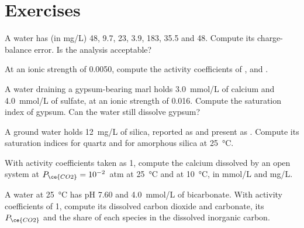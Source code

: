 \section{Exercises}

\begin{exercise}[$\star$]\label{exo:b3:water-rock-interaction:1}
A water has (in \unit{mg/L})  48,  9.7,  23,  3.9,
 183,  35.5 and  48. Compute its charge-balance
error. Is the analysis acceptable?
\end{exercise}

\begin{exercise}[$\star$]\label{exo:b3:water-rock-interaction:2}
At an ionic strength of 0.0050, compute the activity coefficients of
,  and .
\end{exercise}

\begin{exercise}[$\star$]\label{exo:b3:water-rock-interaction:3}
A water draining a gypsum-bearing marl holds \qty{3.0}{mmol/L} of calcium and
\qty{4.0}{mmol/L} of sulfate, at an ionic strength of 0.016. Compute the
saturation index of gypsum. Can the water still dissolve gypsum?
\end{exercise}

\begin{exercise}[$\star$]\label{exo:b3:water-rock-interaction:4}
A ground water holds \qty{12}{mg/L} of silica, reported as  and
present as . Compute its saturation indices for quartz and for
amorphous silica at \qty{25}{\celsius}.
\end{exercise}

\begin{exercise}[$\star\star$]\label{exo:b3:water-rock-interaction:5}
With activity coefficients taken as 1, compute the calcium dissolved by an
open system at $P_{\ce{CO2}} = 10^{-2}$~atm at \qty{25}{\celsius} and at
\qty{10}{\celsius}, in \unit{mmol/L} and \unit{mg/L}.
\end{exercise}

\begin{exercise}[$\star\star$]\label{exo:b3:water-rock-interaction:6}
A water at \qty{25}{\celsius} has pH 7.60 and \qty{4.0}{mmol/L} of
bicarbonate. With activity coefficients of 1, compute its dissolved carbon
dioxide and carbonate, its $P_{\ce{CO2}}$ and the share of each species in
the dissolved inorganic carbon.
\end{exercise}

